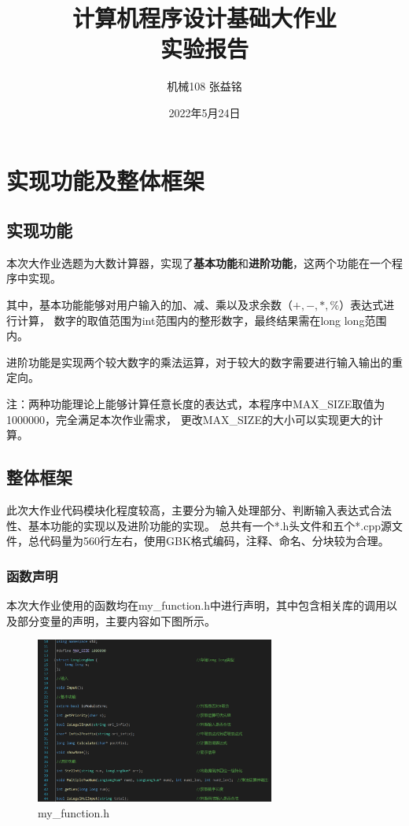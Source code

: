 \documentclass[a4paper, 11pt, UTF8]{ctexart}
\title{计算机程序设计基础大作业\\实验报告}
\author{机械108 \qquad 张益铭 \qquad 2021010552}
\date{2022年5月24日}
\begin{document}
\maketitle

\tableofcontents


\newpage

\section{实现功能及整体框架}

\subsection{实现功能}

本次大作业选题为大数计算器，实现了\textbf{基本功能}和\textbf{进阶功能}，这两个功能在一个程序中实现。

其中，基本功能能够对用户输入的加、减、乘以及求余数（$+, -, *, \% $）表达式进行计算，
数字的取值范围为int范围内的整形数字，最终结果需在long long范围内。

进阶功能是实现两个较大数字的乘法运算，对于较大的数字需要进行输入输出的重定向。

注：两种功能理论上能够计算任意长度的表达式，本程序中MAX\_SIZE取值为1000000，完全满足本次作业需求，
更改MAX\_SIZE的大小可以实现更大的计算。

\subsection{整体框架}

此次大作业代码模块化程度较高，主要分为输入处理部分、判断输入表达式合法性、基本功能的实现以及进阶功能的实现。
总共有一个*.h头文件和五个*.cpp源文件，总代码量为560行左右，使用GBK格式编码，注释、命名、分块较为合理。

\subsubsection{函数声明}

本次大作业使用的函数均在my\_function.h中进行声明，其中包含相关库的调用以及部分变量的声明，主要内容如下图所示。

\begin{figure}[H]
    \centering
    \includegraphics[width=0.7\textwidth]{my_function.png}
    \caption{my\_function.h}
\end{figure}
\end{document}
